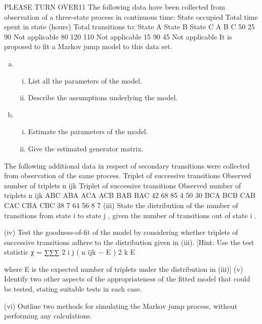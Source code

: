 \documentclass[a4paper,12pt]{article}
\begin{document}
\begin{enumerate}
PLEASE TURN OVER11
The following data have been collected from observation of a three-state process in
continuous time:
State
occupied Total time
spent in state
(hours)
Total transitions to:
State A State B State C
A
B
C 50
25
90 Not applicable
80
120 110
Not applicable
15 90
45
Not applicable
It is proposed to fit a Markov jump model to this data set.

\begin{enumerate}[(a)]
\item 
\begin{enumerate}[(i)]
\item List all the parameters of the model.
\item Describe the assumptions underlying the model. 
\end{enumerate}
\item
\begin{enumerate}[(i)]
\item Estimate the parameters of the model.
\item Give the estimated generator matrix. 
\end{enumerate}
\end{enumerate}
The following additional data in respect of secondary transitions were collected from
observation of the same process.
Triplet of
successive
transitions Observed
number of
triplets
n ijk Triplet of
successive
transitions Observed
number of
triplets
n ijk
ABC
ABA
ACA
ACB
BAB
BAC 42
68
85
4
50
30 BCA
BCB
CAB
CAC
CBA
CBC 38
7
64
56
8
7
(iii) State the distribution of the number of transitions from state i to state j , given
the number of transitions out of state i .

(iv) Test the goodness-of-fit of the model by considering whether triplets of
successive transitions adhere to the distribution given in (iii).
[Hint: Use the test statistic χ = ∑∑∑
2
i
j
( n ijk − E ) 2
k
E

where E is the expected
number of triplets under the distribution in (iii)]
(v) Identify two other aspects of the appropriateness of the fitted model that could
be tested, stating suitable tests in each case.

(vi) Outline two methods for simulating the Markov jump process, without
performing any calculations.












\end{enumerate}
\end{document}
